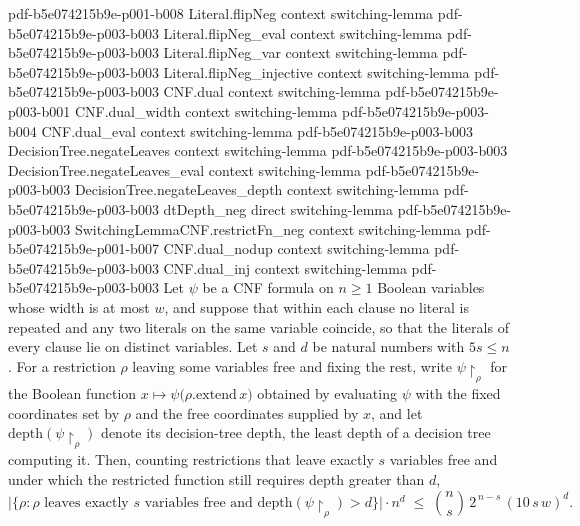 \begin{theorem}
  {pdf-b5e074215b9e-p001-b008}
\proofstep
  {Literal.flipNeg}
  {context}
  {switching-lemma}
  {pdf-b5e074215b9e-p003-b003}
\proofstep
  {Literal.flipNeg_eval}
  {context}
  {switching-lemma}
  {pdf-b5e074215b9e-p003-b003}
\proofstep
  {Literal.flipNeg_var}
  {context}
  {switching-lemma}
  {pdf-b5e074215b9e-p003-b003}
\proofstep
  {Literal.flipNeg_injective}
  {context}
  {switching-lemma}
  {pdf-b5e074215b9e-p003-b003}
\proofstep
  {CNF.dual}
  {context}
  {switching-lemma}
  {pdf-b5e074215b9e-p003-b001}
\proofstep
  {CNF.dual_width}
  {context}
  {switching-lemma}
  {pdf-b5e074215b9e-p003-b004}
\proofstep
  {CNF.dual_eval}
  {context}
  {switching-lemma}
  {pdf-b5e074215b9e-p003-b003}
\proofstep
  {DecisionTree.negateLeaves}
  {context}
  {switching-lemma}
  {pdf-b5e074215b9e-p003-b003}
\proofstep
  {DecisionTree.negateLeaves_eval}
  {context}
  {switching-lemma}
  {pdf-b5e074215b9e-p003-b003}
\proofstep
  {DecisionTree.negateLeaves_depth}
  {context}
  {switching-lemma}
  {pdf-b5e074215b9e-p003-b003}
\proofstep
  {dtDepth_neg}
  {direct}
  {switching-lemma}
  {pdf-b5e074215b9e-p003-b003}
\proofstep
  {SwitchingLemmaCNF.restrictFn_neg}
  {context}
  {switching-lemma}
  {pdf-b5e074215b9e-p001-b007}
\proofstep
  {CNF.dual_nodup}
  {context}
  {switching-lemma}
  {pdf-b5e074215b9e-p003-b003}
\proofstep
  {CNF.dual_inj}
  {context}
  {switching-lemma}
  {pdf-b5e074215b9e-p003-b003}
Let $\psi$ be a CNF formula on $n \ge 1$ Boolean variables whose width is at most $w$,
and suppose that within each clause no literal is repeated and any two literals on the
same variable coincide, so that the literals of every clause lie on distinct variables.
Let $s$ and $d$ be natural numbers with $5s \le n$. For a restriction $\rho$ leaving
some variables free and fixing the rest, write $\psi\!\restriction_\rho$ for the Boolean
function $x \mapsto \psi\bigl(\rho.\mathrm{extend}\,x\bigr)$ obtained by evaluating
$\psi$ with the fixed coordinates set by $\rho$ and the free coordinates supplied by
$x$, and let $\mathrm{depth}(\psi\!\restriction_\rho)$ denote its decision-tree depth,
the least depth of a decision tree computing it. Then, counting restrictions that leave
exactly $s$ variables free and under which the restricted function still requires depth
greater than $d$,
\[
\bigl|\{\rho : \rho \text{ leaves exactly } s \text{ variables free and }
\mathrm{depth}(\psi\!\restriction_\rho) > d\}\bigr| \cdot n^{d}
  \;\le\; \binom{n}{s}\, 2^{\,n-s}\,(10\,s\,w)^{d}.
\]
\end{theorem}

